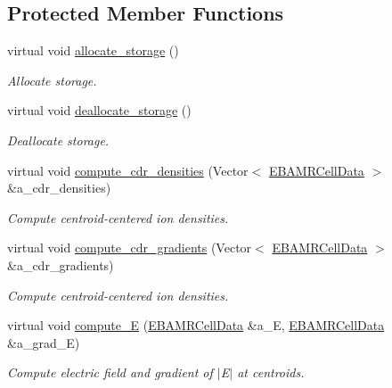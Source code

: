 \subsection*{Protected Member Functions}
\begin{DoxyCompactItemize}
\item 
virtual void \hyperlink{classfull__tagger_aa15031024025d9e6c341c26d98e92f54}{allocate\+\_\+storage} ()
\begin{DoxyCompactList}\small\item\em Allocate storage. \end{DoxyCompactList}\item 
virtual void \hyperlink{classfull__tagger_a89cb2318bfdcaee2776be641a1a38f4c}{deallocate\+\_\+storage} ()
\begin{DoxyCompactList}\small\item\em Deallocate storage. \end{DoxyCompactList}\item 
virtual void \hyperlink{classfull__tagger_a85fd9d59114503eb912a9fbda2486539}{compute\+\_\+cdr\+\_\+densities} (Vector$<$ \hyperlink{type__definitions_8H_a7e610f301989e5e07781c5e338bdb7c3}{E\+B\+A\+M\+R\+Cell\+Data} $>$ \&a\+\_\+cdr\+\_\+densities)
\begin{DoxyCompactList}\small\item\em Compute centroid-\/centered ion densities. \end{DoxyCompactList}\item 
virtual void \hyperlink{classfull__tagger_a1440d8d98b31d37e3dd94618545de7a2}{compute\+\_\+cdr\+\_\+gradients} (Vector$<$ \hyperlink{type__definitions_8H_a7e610f301989e5e07781c5e338bdb7c3}{E\+B\+A\+M\+R\+Cell\+Data} $>$ \&a\+\_\+cdr\+\_\+gradients)
\begin{DoxyCompactList}\small\item\em Compute centroid-\/centered ion densities. \end{DoxyCompactList}\item 
virtual void \hyperlink{classfull__tagger_a300a09cd5d4c1cf7ae100de4dba0deaa}{compute\+\_\+E} (\hyperlink{type__definitions_8H_a7e610f301989e5e07781c5e338bdb7c3}{E\+B\+A\+M\+R\+Cell\+Data} \&a\+\_\+E, \hyperlink{type__definitions_8H_a7e610f301989e5e07781c5e338bdb7c3}{E\+B\+A\+M\+R\+Cell\+Data} \&a\+\_\+grad\+\_\+E)
\begin{DoxyCompactList}\small\item\em Compute electric field and gradient of $\vert$\+E$\vert$ at centroids. \end{DoxyCompactList}\item 

\end{DoxyCompactItemize}
